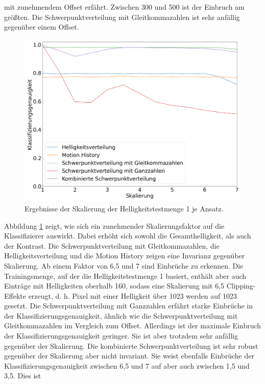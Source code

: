 mit zunehmendem Offset erfährt. Zwischen 300 und 500 ist der Einbruch am größten. Die Schwerpunktverteilung mit Gleitkommazahlen ist sehr anfällig gegenüber einem Offset.
\begin{figure}[h!]
    \centering
    \includegraphics[width=\linewidth]{images/brightness_scaling.png}
    \caption{Ergebnisse der Skalierung der Helligkeitstestmenge 1 je Ansatz.}
    \label{fig:brightness_scaling}
\end{figure}
\newline
\newline
Abbildung \ref{fig:brightness_scaling} zeigt, wie sich ein zunehmender Skalierungsfaktor auf die Klassifizierer auswirkt. Dabei erhöht sich sowohl die Gesamthelligkeit, als auch der Kontrast. Die Schwerpunktverteilung mit
Gleitkommazahlen, die Helligkeitsverteilung und die Motion History zeigen eine Invarianz gegenüber Skalierung. Ab einem Faktor von 6,5 und 7 sind Einbrüche zu erkennen. Die Trainingsmenge, auf der die
Helligkeitstestmenge 1 basiert, enthält aber auch Einträge mit Helligkeiten oberhalb 160, sodass eine Skalierung mit 6,5 Clipping-Effekte erzeugt, d. h. Pixel mit einer Helligkeit
über 1023 werden auf 1023 gesetzt. Die Schwerpunktverteilung mit Ganzzahlen erfährt starke Einbrüche in der Klassifizierungsgenauigkeit, ähnlich wie die Schwerpunktverteilung mit Gleitkommazahlen im
Vergleich zum Offset. Allerdings ist der maximale Einbruch der Klassifizierungsgenauigkeit geringer. Sie ist aber trotzdem sehr anfällig gegenüber der Skalierung. Die kombinierte Schwerpunktverteilung
ist sehr robust gegenüber der Skalierung aber nicht invariant. Sie weist ebenfalls Einbrüche der Klassifizierungsgenauigkeit zwischen 6,5 und 7 auf aber auch zwischen 1,5 und 3,5. Dies ist
